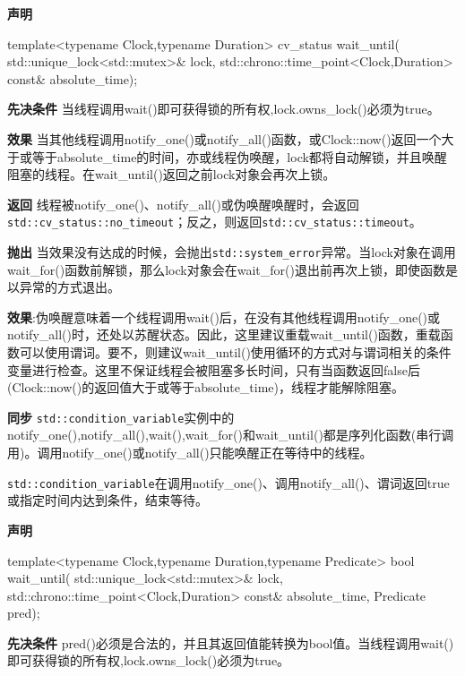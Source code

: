 \textbf{声明}

\begin{cpp}
template<typename Clock,typename Duration>
cv_status wait_until(
    std::unique_lock<std::mutex>& lock,
    std::chrono::time_point<Clock,Duration> const& absolute_time);
\end{cpp}

\textbf{先决条件}
当线程调用wait()即可获得锁的所有权,lock.owns\_lock()必须为true。

\textbf{效果}
当其他线程调用notify\_one()或notify\_all()函数，或Clock::now()返回一个大于或等于absolute\_time的时间，亦或线程伪唤醒，lock都将自动解锁，并且唤醒阻塞的线程。在wait\_until()返回之前lock对象会再次上锁。

\textbf{返回}
线程被notify\_one()、notify\_all()或伪唤醒唤醒时，会返回\texttt{std::cv\_status::no\_timeout}；反之，则返回\texttt{std::cv\_status::timeout}。

\textbf{抛出}
当效果没有达成的时候，会抛出\texttt{std::system\_error}异常。当lock对象在调用wait\_for()函数前解锁，那么lock对象会在wait\_for()退出前再次上锁，即使函数是以异常的方式退出。

\textbf{效果}:伪唤醒意味着一个线程调用wait()后，在没有其他线程调用notify\_one()或notify\_all()时，还处以苏醒状态。因此，这里建议重载wait\_until()函数，重载函数可以使用谓词。要不，则建议wait\_until()使用循环的方式对与谓词相关的条件变量进行检查。这里不保证线程会被阻塞多长时间，只有当函数返回false后(Clock::now()的返回值大于或等于absolute\_time)，线程才能解除阻塞。

\textbf{同步}
\texttt{std::condition\_variable}实例中的notify\_one(),notify\_all(),wait(),wait\_for()和wait\_until()都是序列化函数(串行调用)。调用notify\_one()或notify\_all()只能唤醒正在等待中的线程。


\texttt{std::condition\_variable}在调用notify\_one()、调用notify\_all()、谓词返回true或指定时间内达到条件，结束等待。

\textbf{声明}

\begin{cpp}
template<typename Clock,typename Duration,typename Predicate>
bool wait_until(
    std::unique_lock<std::mutex>& lock,
    std::chrono::time_point<Clock,Duration> const& absolute_time,
    Predicate pred);
\end{cpp}

\textbf{先决条件}
pred()必须是合法的，并且其返回值能转换为bool值。当线程调用wait()即可获得锁的所有权,lock.owns\_lock()必须为true。

